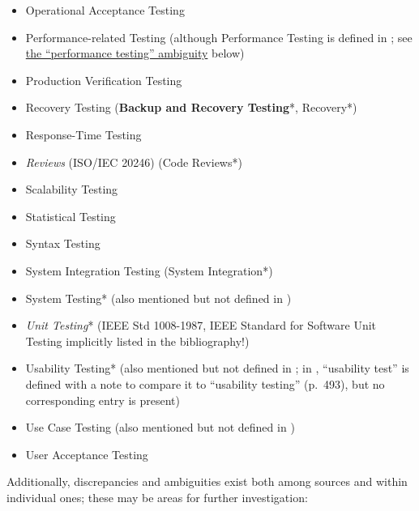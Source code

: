 \begin{itemize}
      \item Operational Acceptance Testing
      \item Performance-related Testing (although Performance Testing is
            defined in \citep{IEEE2022}; see \hyperref[perf-test-ambiguity]
            {the ``performance testing'' ambiguity} below)
      \item Production Verification Testing
      \item Recovery Testing (\textbf{Backup and Recovery Testing}*, Recovery*)
      \item Response-Time Testing
      \item \emph{Reviews} (ISO/IEC 20246) (Code Reviews*)
      \item Scalability Testing
      \item Statistical Testing
      \item Syntax Testing
      \item System Integration Testing (System Integration*)
      \item System Testing* (also mentioned but not defined in \citep{IEEE2013})
      \item \emph{Unit Testing}* (IEEE Std 1008-1987, IEEE Standard for
            Software Unit Testing implicitly listed in the bibliography!)
      \item Usability Testing* (also mentioned but not defined in \citep{IEEE2013};
            in \citep{IEEE2017}, ``usability test'' is defined with a note to
            compare it to ``usability testing'' (p.~493), but no corresponding
            entry is present)
      \item Use Case Testing (also mentioned but not defined in \citep{IEEE2013})
      \item User Acceptance Testing
\end{itemize}

Additionally, discrepancies and ambiguities exist both among sources and
within individual ones; these may be areas for further investigation:

\newcommand{\procLevel}[1]{``Test level'' can also refer to the scope
of a test process; for example, ``across the whole organization'' or only
``to specific projects'' #1[p.~24]{IEEE2022}}
\newcommand{\phaseDef}{can also refer to the ``period of time in the software
      life cycle'' when testing occurs \citeyearpar[p.~470]{IEEE2017}, usually
      after the implementation phase \citeyearpar[pp.~420, 509]{IEEE2017}.}

